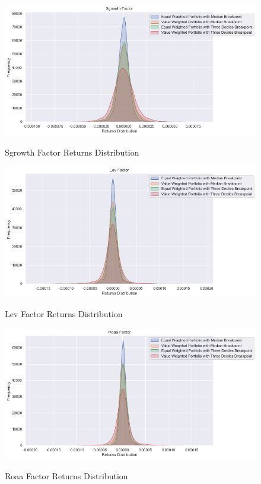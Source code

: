 \begin{figure}[H]
	\caption{Sgrowth Factor Returns Distribution}
	\centering
	\includegraphics[scale=.63]{../../output/figures/sgrowth.png}
	\label{fig:sgrowth}
\end{figure}

\begin{figure}[H]
	\caption{Lev Factor Returns Distribution}
	\centering
	\includegraphics[scale=.63]{../../output/figures/lev.png}
	\label{fig:lev}
\end{figure}

\begin{figure}[H]
	\caption{Roaa Factor Returns Distribution}
	\centering
	\includegraphics[scale=.63]{../../output/figures/roaa.png}
	\label{fig:roaa}
\end{figure}

